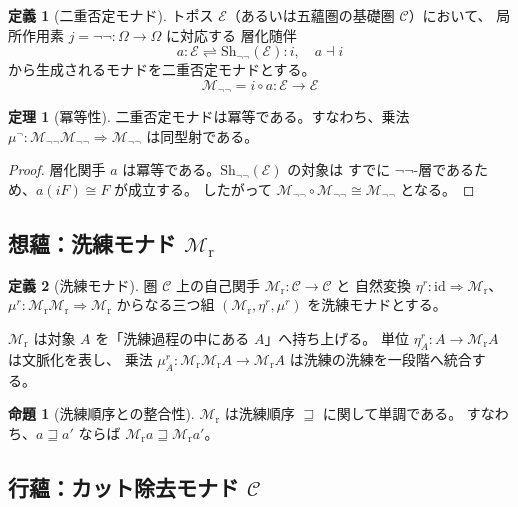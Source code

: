 \documentclass[11pt,a4paper]{article}
\theoremstyle{definition}
\newtheorem{definition}{定義}[section]
\newtheorem{theorem}{定理}[section]
\newtheorem{proposition}{命題}[section]
\newcommand{\id}{\mathrm{id}}
\newcommand{\Mneg}{\mathcal{M}_{\neg\neg}}
\newcommand{\Mr}{\mathcal{M}_{\mathrm{r}}}
\newcommand{\Mc}{\mathcal{C}}
\begin{document}
\begin{definition}[二重否定モナド]
トポス $\mathcal{E}$（あるいは五蘊圏の基礎圏 $\mathcal{C}$）において、
局所作用素 $j = \neg\neg : \Omega \to \Omega$ に対応する
層化随伴
\begin{equation}
a : \mathcal{E} \rightleftharpoons \mathrm{Sh}_{\neg\neg}(\mathcal{E}) : i,
\quad a \dashv i
\end{equation}
から生成されるモナドを二重否定モナドとする。
\begin{equation}
\Mneg = i \circ a : \mathcal{E} \to \mathcal{E}
\end{equation}
\end{definition}

\begin{theorem}[冪等性]
二重否定モナドは冪等である。すなわち、乗法
$\mu^\neg : \Mneg\Mneg \Rightarrow \Mneg$ は同型射である。
\end{theorem}
\begin{proof}
層化関手 $a$ は冪等である。$\mathrm{Sh}_{\neg\neg}(\mathcal{E})$ の対象は
すでに $\neg\neg$-層であるため、$a(iF) \cong F$ が成立する。
したがって $\Mneg \circ \Mneg \cong \Mneg$ となる。
\end{proof}

\subsection{想蘊：洗練モナド \texorpdfstring{$\Mr$}{M-r}}

\begin{definition}[洗練モナド]
圏 $\mathcal{C}$ 上の自己関手 $\Mr : \mathcal{C} \to \mathcal{C}$ と
自然変換 $\eta^r : \id \Rightarrow \Mr$、$\mu^r : \Mr\Mr \Rightarrow \Mr$
からなる三つ組 $(\Mr, \eta^r, \mu^r)$ を洗練モナドとする。

$\Mr$ は対象 $A$ を「洗練過程の中にある $A$」へ持ち上げる。
単位 $\eta^r_A : A \to \Mr A$ は文脈化を表し、
乗法 $\mu^r_A : \Mr\Mr A \to \Mr A$ は洗練の洗練を一段階へ統合する。
\end{definition}

\begin{proposition}[洗練順序との整合性]
$\Mr$ は洗練順序 $\sqsupseteq$ に関して単調である。
すなわち、$a \sqsupseteq a'$ ならば $\Mr a \sqsupseteq \Mr a'$。
\end{proposition}

\subsection{行蘊：カット除去モナド \texorpdfstring{$\Mc$}{C}}
\end{document}
